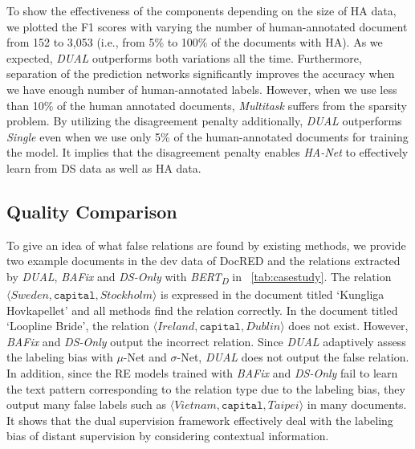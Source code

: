 \documentclass[11pt]{article}
\newcommand{\triple}[3]{\ensuremath{\langle #1,#2,#3\rangle}}
\newcommand{\hanet}{\emph{HA-Net}\xspace}
\newcommand{\munet}{$\mu$-Net\xspace}
\newcommand{\sigmanet}{$\sigma$-Net\xspace}
\newcommand{\relationt}[1]{\texttt{#1}}
\newcommand{\dbert}{\emph{BERT\textsubscript{D}}\xspace}
\newcommand{\dual}{\emph{DUAL}\xspace}
\newcommand{\bafix}{\emph{BAFix}\xspace}
\newcommand{\dsonly}{\emph{DS-Only}\xspace}
\newcommand{\multitask}{\emph{Multitask}\xspace}
\newcommand{\single}{\emph{Single}\xspace}
\begin{document}
To show the effectiveness of the components depending on the size of HA data, we plotted the F1 scores with varying the number of human-annotated document from 152 to 3,053 (i.e., from 5\% to 100\% of the documents with HA).
As we expected, \dual outperforms both variations all the time.
Furthermore, separation of the prediction networks significantly improves the accuracy when we have enough number of human-annotated labels.
However, when we use less than 10\% of the human annotated documents, \multitask suffers from the sparsity problem.
By utilizing the disagreement penalty additionally, \dual outperforms \single even when we use only 5\% of the human-annotated documents for training the model.
It implies that the disagreement penalty enables \hanet to effectively learn from DS data as well as HA data.














\subsection{Quality Comparison}
To give an idea of what false relations are found by existing methods,
we provide two example documents in the dev data of DocRED and the relations extracted by \dual, \bafix and \dsonly with \dbert in \tablename~\ref{tab:casestudy}.
The relation \triple{Sweden}{\relationt{capital}}{Stockholm} is expressed in the document titled `Kungliga Hovkapellet' and
all methods find the relation correctly.
In the document titled `Loopline Bride', the relation \triple{Ireland}{\relationt{capital}}{Dublin} does not exist.
However, \bafix and \dsonly output the incorrect relation.
Since \dual adaptively assess the labeling bias with \munet and \sigmanet, \dual does not output the false relation.
In addition, since the RE models trained with \bafix and \dsonly fail to learn the text pattern corresponding to the relation type due to the labeling bias, they output many false labels such as \triple{Vietnam}{\relationt{capital}}{Taipei} in many documents.
It shows that the dual supervision framework effectively deal with the labeling bias of distant supervision by considering contextual information.
\end{document}
